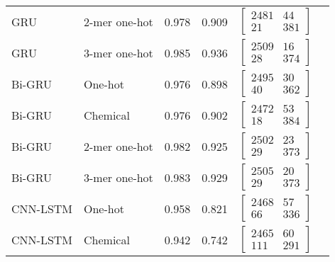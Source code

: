 \begin{longtable}{llllll}
    GRU & 2-mer one-hot & 0.978 & 0.909 &
    $\begin{bmatrix}
        2481 & 44\\ 
        21 & 381
    \end{bmatrix}$
    \\

    GRU & 3-mer one-hot & 0.985 & 0.936 &
    $\begin{bmatrix}
        2509 & 16\\ 
        28 & 374
    \end{bmatrix}$
    \\\midrule


    Bi-GRU & One-hot & 0.976 & 0.898 &
    $\begin{bmatrix}
        2495 & 30\\ 
        40 & 362
    \end{bmatrix}$
    \\

    Bi-GRU & Chemical & 0.976 & 0.902 &
    $\begin{bmatrix}
        2472 & 53\\ 
        18 & 384
    \end{bmatrix}$
    \\

    Bi-GRU & 2-mer one-hot & 0.982 & 0.925 &
    $\begin{bmatrix}
        2502 & 23\\ 
        29 & 373
    \end{bmatrix}$
    \\

    Bi-GRU & 3-mer one-hot & 0.983 & 0.929 &
    $\begin{bmatrix}
        2505 & 20\\ 
        29 & 373
    \end{bmatrix}$
    \\\midrule


    CNN-LSTM & One-hot & 0.958 & 0.821 &
    $\begin{bmatrix}
        2468 & 57\\
        66 & 336
    \end{bmatrix}$
    \\

    CNN-LSTM & Chemical & 0.942 & 0.742 &
    $\begin{bmatrix}
        2465 & 60\\ 
        111 & 291
    \end{bmatrix}$
    \\


\end{longtable}
